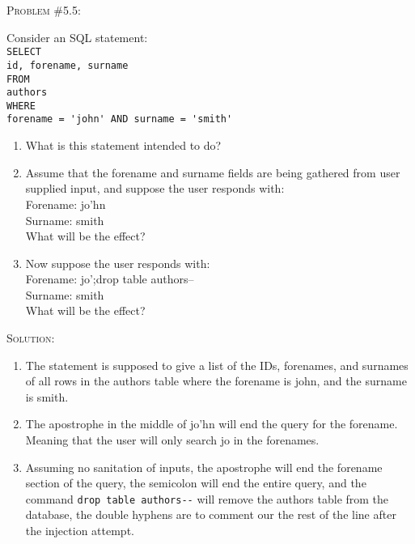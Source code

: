 \documentclass[12pt]{article}
\newenvironment{problem}[1]
{\begin{mdframed}[linewidth=0.8pt]
        \textsc{Problem #1:}

}
    {\end{mdframed}}
\newenvironment{solution}
    {\textsc{Solution:}\\}
    {\newpage}%
\begin{document}
	\begin{problem}{\#5.5}
		Consider an SQL statement:\\
		\verb|SELECT|\\
		\verb|id, forename, surname|\\
		\verb|FROM|\\
		\verb|authors|\\
		\verb|WHERE|\\
		\verb|forename = 'john' AND surname = 'smith'|
		\begin{enumerate}[label=\alph*]
			\item What is this statement intended to do?
			\item Assume that the forename and surname fields are being gathered
				from user supplied input, and suppose the user responds with:\\
				Forename: jo'hn\\
				Surname: smith\\
				What will be the effect?
			\item Now suppose the user responds with:\\
				Forename: jo';drop table authors--\\
				Surname: smith\\
				What will be the effect?
		\end{enumerate}
	\end{problem}
	\begin{solution}
		\begin{enumerate}[label=\alph*]
			\item The statement is supposed to give a list of the IDs, forenames, and
				surnames of all rows in the authors table where the forename is
				john, and the surname is smith.
			\item The apostrophe in the middle of jo'hn will end the query for the forename.
				Meaning that the user will only search jo in the forenames.
			\item Assuming no sanitation of inputs, the apostrophe will end the forename
				section of the query, the semicolon will end the entire query, and
				the command \verb|drop table authors--| will remove the authors table
				from the database, the double hyphens are to comment our the rest of the
				line after the injection attempt.
		\end{enumerate}
	\end{solution}
\end{document}
